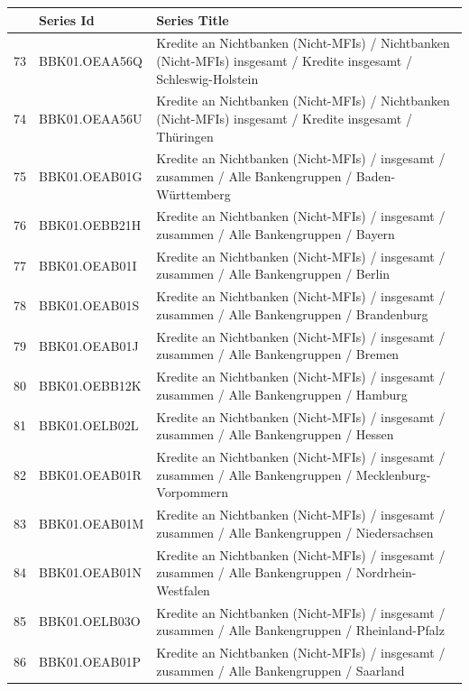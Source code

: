 \documentclass[12pt]{article}
\begin{document}
\begin{table}
\centering
\begin{tabular}{rp{5cm}p{11cm}}  
& \textbf{Series Id} & \textbf{Series Title} \\
  \hline
  \hline

  73 & BBK01.OEAA56Q & Kredite an Nichtbanken (Nicht-MFIs) / Nichtbanken (Nicht-MFIs) insgesamt / Kredite insgesamt / Schleswig-Holstein \\ 
  \hline
  74 & BBK01.OEAA56U & Kredite an Nichtbanken (Nicht-MFIs) / Nichtbanken (Nicht-MFIs) insgesamt / Kredite insgesamt / Thüringen \\ 
  \hline
  75 & BBK01.OEAB01G & Kredite an Nichtbanken (Nicht-MFIs) / insgesamt /  zusammen / Alle Bankengruppen / Baden-Württemberg \\ 
  \hline
  76 & BBK01.OEBB21H & Kredite an Nichtbanken (Nicht-MFIs) / insgesamt / zusammen / Alle Bankengruppen / Bayern \\ 
  \hline
  77 & BBK01.OEAB01I & Kredite an Nichtbanken (Nicht-MFIs) / insgesamt / zusammen / Alle Bankengruppen / Berlin \\ 
  \hline
  78 & BBK01.OEAB01S & Kredite an Nichtbanken (Nicht-MFIs) / insgesamt / zusammen / Alle Bankengruppen / Brandenburg \\ 
  \hline
  79 & BBK01.OEAB01J & Kredite an Nichtbanken (Nicht-MFIs) / insgesamt / zusammen / Alle Bankengruppen / Bremen \\ 
  \hline
  80 & BBK01.OEBB12K & Kredite an Nichtbanken (Nicht-MFIs) / insgesamt / zusammen / Alle Bankengruppen / Hamburg \\ 
  \hline
  81 & BBK01.OELB02L & Kredite an Nichtbanken (Nicht-MFIs) / insgesamt / zusammen / Alle Bankengruppen / Hessen \\ 
  \hline
  82 & BBK01.OEAB01R & Kredite an Nichtbanken (Nicht-MFIs) / insgesamt / zusammen / Alle Bankengruppen / Mecklenburg-Vorpommern \\ 
  \hline
  83 & BBK01.OEAB01M & Kredite an Nichtbanken (Nicht-MFIs) / insgesamt / zusammen / Alle Bankengruppen / Niedersachsen \\ 
  \hline
  84 & BBK01.OEAB01N & Kredite an Nichtbanken (Nicht-MFIs) / insgesamt / zusammen / Alle Bankengruppen / Nordrhein-Westfalen \\ 
  \hline
  85 & BBK01.OELB03O & Kredite an Nichtbanken (Nicht-MFIs) / insgesamt / zusammen / Alle Bankengruppen / Rheinland-Pfalz \\ 
  \hline
  86 & BBK01.OEAB01P & Kredite an Nichtbanken (Nicht-MFIs) / insgesamt / zusammen / Alle Bankengruppen / Saarland \\ 

\end{tabular}
\end{table}
\end{document}
